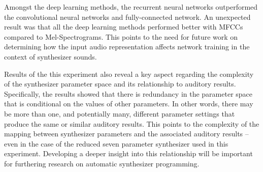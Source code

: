 Amongst the deep learning methods, the recurrent neural networks outperformed the convolutional neural networks and fully-connected network. An unexpected result was that all the deep learning methods performed better with MFCCs compared to Mel-Spectrograms. This points to the need for future work on determining how the input audio representation affects network training in the context of synthesizer sounds.

Results of the this experiment also reveal a key aspect regarding the complexity of the synthesizer parameter space and its relationship to auditory results. Specifically, the results showed that there is redundancy in the parameter space that is conditional on the values of other parameters. In other words, there may be more than one, and potentially many, different parameter settings that produce the same or similar auditory results. This points to the complexity of the mapping between synthesizer parameters and the associated auditory results -- even in the case of the reduced seven parameter synthesizer used in this experiment. Developing a deeper insight into this relationship will be important for furthering research on automatic synthesizer programming.










